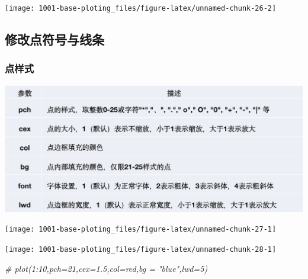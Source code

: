 \documentclass[
]{book}
\newenvironment{Shaded}{\begin{snugshade}}{\end{snugshade}}
\newcommand{\AttributeTok}[1]{\textcolor[rgb]{0.77,0.63,0.00}{#1}}
\newcommand{\CommentTok}[1]{\textcolor[rgb]{0.56,0.35,0.01}{\textit{#1}}}
\newcommand{\DecValTok}[1]{\textcolor[rgb]{0.00,0.00,0.81}{#1}}
\newcommand{\FunctionTok}[1]{\textcolor[rgb]{0.00,0.00,0.00}{#1}}
\newcommand{\NormalTok}[1]{#1}
\newcommand{\SpecialCharTok}[1]{\textcolor[rgb]{0.00,0.00,0.00}{#1}}
\begin{document}
\begin{center}\texttt{[image: 1001-base-ploting\_files/figure-latex/unnamed-chunk-26-2]} \end{center}

\hypertarget{ux4feeux6539ux70b9ux7b26ux53f7ux4e0eux7ebfux6761}{%
\subsection{修改点符号与线条}\label{ux4feeux6539ux70b9ux7b26ux53f7ux4e0eux7ebfux6761}}

\hypertarget{ux70b9ux6837ux5f0f}{%
\subsubsection{点样式}\label{ux70b9ux6837ux5f0f}}

\includegraphics{figure/5.jpg}

\begin{center}\texttt{[image: 1001-base-ploting\_files/figure-latex/unnamed-chunk-27-1]} \end{center}

\begin{Shaded}
\end{Shaded}

\begin{center}\texttt{[image: 1001-base-ploting\_files/figure-latex/unnamed-chunk-28-1]} \end{center}

\begin{Shaded}
\begin{Highlighting}[]
\CommentTok{\# plot(1:10,pch=21,cex=1.5,col=\textquotesingle{}red\textquotesingle{},bg = "blue",lwd=5)}
\end{Highlighting}
\end{Shaded}
\end{document}
